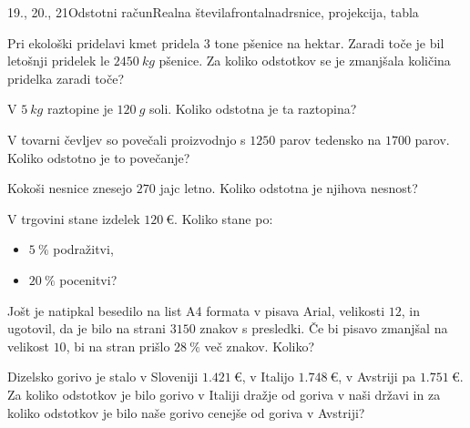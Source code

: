 \begin{priprava}{19., 20., 21}{}{Odstotni račun}{Realna števila}{frontalna}{drsnice, projekcija, tabla}
    
    
        \begin{naloga}
            Pri ekološki pridelavi kmet pridela $3$ tone pšenice na hektar. 
            Zaradi toče je bil letošnji pridelek le $2450~kg$ pšenice.
            Za koliko odstotkov se je zmanjšala količina pridelka zaradi toče? 
        \end{naloga}

        \begin{naloga}
            V $5~kg$ raztopine je $120~g$ soli. Koliko odstotna je ta raztopina? 
        \end{naloga}

        \begin{naloga}
            V tovarni čevljev so povečali proizvodnjo s $1250$ parov tedensko na $1700$ parov.
            Koliko odstotno je to povečanje? 
        \end{naloga}
    

    
        \begin{naloga}
            Kokoši nesnice znesejo $270$ jajc letno. 
            Koliko odstotna je njihova nesnost? 
        \end{naloga}

        \begin{naloga}
            V trgovini stane izdelek $120~€$. Koliko stane po:
            \begin{itemize}
                \item $5~\%$ podražitvi,
                \item $20~\%$ pocenitvi?
            \end{itemize}
        \end{naloga}

        \begin{naloga}
            Jošt je natipkal besedilo na list A4 formata v pisava Arial, velikosti $12$, in ugotovil, da je bilo na strani $3150$ znakov s presledki.
            Če bi pisavo zmanjšal na velikost $10$, bi na stran prišlo $28~\%$ več znakov. Koliko? 
        \end{naloga}
    

    
    
        \begin{naloga}
            Dizelsko gorivo je stalo v Sloveniji $1.421~€$, v Italijo $1.748~€$, v Avstriji pa $1.751~€$.
            Za koliko odstotkov je bilo gorivo v Italiji dražje od goriva v naši državi in za koliko odstotkov je bilo
            naše gorivo cenejše od goriva v Avstriji? 
        \end{naloga}


\end{priprava}
